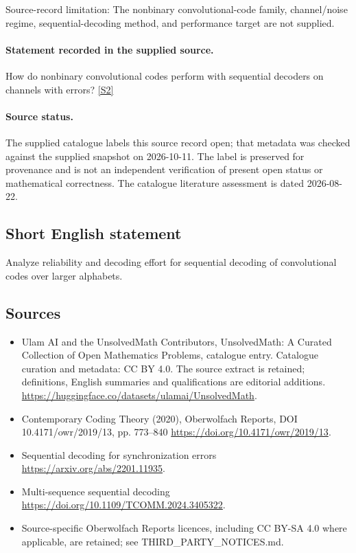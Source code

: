 \documentclass[11pt]{article}
\begin{document}
Source-record limitation: The nonbinary convolutional-code family, channel/noise regime, sequential-decoding method, and performance target are not supplied.
\paragraph{Statement recorded in the supplied source.}
How do nonbinary convolutional codes perform with sequential decoders on channels with errors? \href{https://doi.org/10.4171/owr/2019/13}{[S2]}
\paragraph{Source status.}
The supplied catalogue labels this source record open; that metadata was checked against the supplied snapshot on 2026-10-11. The label is preserved for provenance and is not an independent verification of present open status or mathematical correctness. The catalogue literature assessment is dated 2026-08-22.
\subsection{Short English statement}
Analyze reliability and decoding effort for sequential decoding of convolutional codes over larger alphabets.
\subsection{Sources}
\begin{itemize}
\item[S1] Ulam AI and the UnsolvedMath Contributors, UnsolvedMath: A Curated Collection of Open Mathematics Problems, catalogue entry. Catalogue curation and metadata: CC BY 4.0. The source extract is retained; definitions, English summaries and qualifications are editorial additions.
\url{https://huggingface.co/datasets/ulamai/UnsolvedMath}.
\item[S2] Contemporary Coding Theory (2020), Oberwolfach Reports, DOI 10.4171/owr/2019/13, pp. 773--840
\url{https://doi.org/10.4171/owr/2019/13}.
\item[S3] Sequential decoding for synchronization errors
\url{https://arxiv.org/abs/2201.11935}.
\item[S4] Multi-sequence sequential decoding
\url{https://doi.org/10.1109/TCOMM.2024.3405322}.
\item Source-specific Oberwolfach Reports licences, including CC BY-SA 4.0 where applicable, are retained; see THIRD\_PARTY\_NOTICES.md.
\end{itemize}
\end{document}
